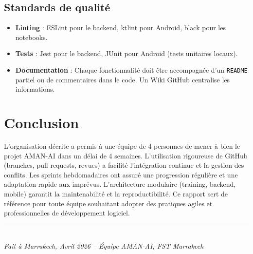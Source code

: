 \documentclass[11pt,a4paper]{article}
\begin{document}
\subsection{Standards de qualité}
\begin{itemize}
    \item \textbf{Linting} : ESLint pour le backend, ktlint pour Android, black pour les notebooks.
    \item \textbf{Tests} : Jest pour le backend, JUnit pour Android (tests unitaires locaux).
    \item \textbf{Documentation} : Chaque fonctionnalité doit être accompagnée d’un \texttt{README} partiel ou de commentaires dans le code. Un Wiki GitHub centralise les informations.
\end{itemize}

\section{Conclusion}
L’organisation décrite a permis à une équipe de 4 personnes de mener à bien le projet AMAN-AI dans un délai de 4 semaines. L’utilisation rigoureuse de GitHub (branches, pull requests, revues) a facilité l’intégration continue et la gestion des conflits. Les sprints hebdomadaires ont assuré une progression régulière et une adaptation rapide aux imprévus. L’architecture modulaire (training, backend, mobile) garantit la maintenabilité et la reproductibilité. Ce rapport sert de référence pour toute équipe souhaitant adopter des pratiques agiles et professionnelles de développement logiciel.

\vfill
\begin{center}
\textcolor{primary}{\rule{0.8\textwidth}{0.4pt}}\\
\small\textit{Fait à Marrakech, Avril 2026 – Équipe AMAN-AI, FST Marrakech}
\end{center}
\end{document}

